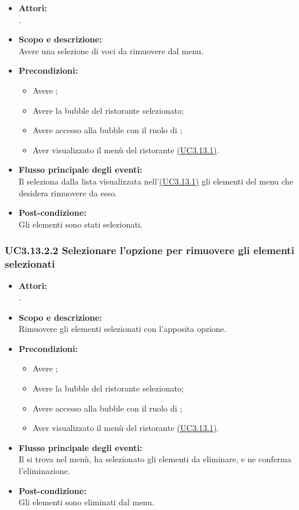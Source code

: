 \begin{itemize}
	\item \textbf{Attori:}
	\\.
	\item \textbf{Scopo e descrizione:} 
	\\Avere una selezione di voci da rimuovere dal menu.
	\item \textbf{Precondizioni:}
	\begin{itemize}
		\item Avere ;
		\item Avere la bubble del ristorante selezionato;
		\item Avere accesso alla bubble con il ruolo di ;
		\item Aver visualizzato il menù del ristorante \hyperref[UC3.13.1]{(UC3.13.1)}.
	\end{itemize}
	\item \textbf{Flusso principale degli eventi:}
	\\Il {} seleziona dalla lista visualizzata nell'\hyperref[UC3.13.1]{(UC3.13.1)} gli elementi del menu che desidera rimuovere da esso.
	\item \textbf{Post-condizione:}
	\\Gli elementi sono stati selezionati.
\end{itemize}

\subsubsection{UC3.13.2.2 Selezionare l'opzione per rimuovere gli elementi selezionati} \label{UC3.13.2.2}

\begin{itemize}
	\item \textbf{Attori:}
	\\.
	\item \textbf{Scopo e descrizione:} 
	\\Rimuovere gli elementi selezionati con l'apposita opzione.
	\item \textbf{Precondizioni:}
	\begin{itemize}
		\item Avere ;
		\item Avere la bubble del ristorante selezionato;
		\item Avere accesso alla bubble con il ruolo di ;
		\item Aver visualizzato il menù del ristorante \hyperref[UC3.13.1]{(UC3.13.1)}.
	\end{itemize}
	\item \textbf{Flusso principale degli eventi:}
	\\Il {} si trova nel menù, ha selezionato gli elementi da eliminare, e ne conferma l'eliminazione.
	\item \textbf{Post-condizione:}
	\\Gli elementi sono eliminati dal menu.
\end{itemize}

